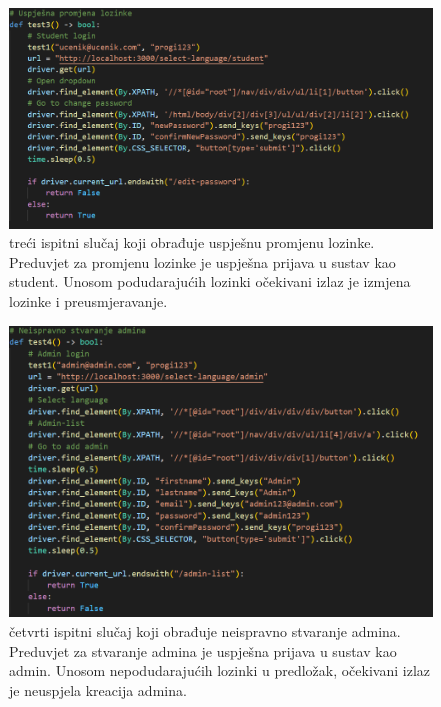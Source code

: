 \begin{figure}[htp]
    \caption{treći ispitni slučaj koji obrađuje uspješnu promjenu lozinke. Preduvjet za promjenu lozinke je uspješna prijava u sustav kao student. Unosom podudarajućih lozinki očekivani izlaz je izmjena lozinke i preusmjeravanje.}
    \includegraphics[scale=0.5]{dijagrami/test3.png}
    \centering
    
\end{figure}
\break

\begin{figure}[htp]
    \caption{četvrti ispitni slučaj koji obrađuje neispravno stvaranje admina. Preduvjet za stvaranje admina je uspješna prijava u sustav kao admin. Unosom nepodudarajućih lozinki u predložak, očekivani izlaz je neuspjela kreacija admina.}
    \includegraphics[scale=0.5]{dijagrami/test4.png}
    \centering
    
\end{figure}
\break

